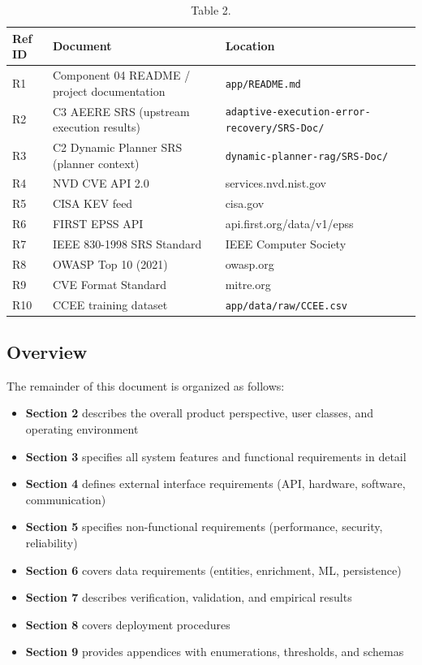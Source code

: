 \documentclass[10pt,journal,onecolumn]{IEEEtran}
\begin{document}
\begin{table}[h]
\caption{Table 2.}
\label{tab:t2}
\begin{tabularx}{\columnwidth}{l >{\raggedright\arraybackslash}X >{\raggedright\arraybackslash}X}
\toprule
\textbf{Ref ID} & \textbf{Document} & \textbf{Location}\\
\midrule
R1 & Component 04 README / project documentation & \texttt{app/README.md}\\
R2 & C3 AEERE SRS (upstream execution results) & \texttt{adaptive-\allowbreak execution-\allowbreak error-\allowbreak recovery/\allowbreak SRS-\allowbreak Doc/\allowbreak }\\
R3 & C2 Dynamic Planner SRS (planner context) & \texttt{dynamic-\allowbreak planner-\allowbreak rag/\allowbreak SRS-\allowbreak Doc/\allowbreak }\\
R4 & NVD CVE API 2.0 & services.nvd.nist.gov\\
R5 & CISA KEV feed & cisa.gov\\
R6 & FIRST EPSS API & api.first.org/data/v1/epss\\
R7 & IEEE 830-1998 SRS Standard & IEEE Computer Society\\
R8 & OWASP Top 10 (2021) & owasp.org\\
R9 & CVE Format Standard & mitre.org\\
R10 & CCEE training dataset & \texttt{app/data/raw/CCEE.csv}\\
\bottomrule
\end{tabularx}
\end{table}

\subsection{Overview}

The remainder of this document is organized as follows:

\begin{itemize}
\item \textbf{Section 2} describes the overall product perspective, user classes, and operating environment
\item \textbf{Section 3} specifies all system features and functional requirements in detail
\item \textbf{Section 4} defines external interface requirements (API, hardware, software, communication)
\item \textbf{Section 5} specifies non-functional requirements (performance, security, reliability)
\item \textbf{Section 6} covers data requirements (entities, enrichment, ML, persistence)
\item \textbf{Section 7} describes verification, validation, and empirical results
\item \textbf{Section 8} covers deployment procedures
\item \textbf{Section 9} provides appendices with enumerations, thresholds, and schemas
\end{itemize}
\end{document}
